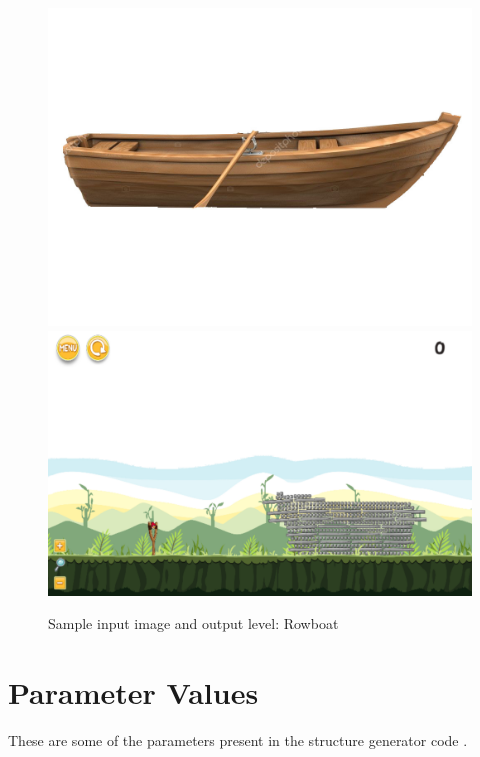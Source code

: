 \documentclass{dalthesis}
\begin{document}
\begin{figure}
	\caption{Sample input image and output level: Rowboat}
  \includegraphics[width=\textwidth,height=\textheight,keepaspectratio]{levels/pictures/ships/rowboat.jpg}
  \includegraphics[width=\textwidth,height=\textheight,keepaspectratio]{levels/screenshots/ships/rowboat.png}
\end{figure}

\chapter{Parameter Values}\label{sec:appendix}

	These are some of the parameters present in the structure generator code \cite{science_birds_pcg}.
\end{document}
